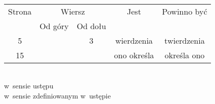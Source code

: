\documentclass[a4paper,11pt]{article}
\begin{document}
\vspace{\VerSpaceFour}





\noindent
{}  \\

\vspace{\VerSpaceFour}





\noindent
{}




\newpage



\begin{center}

  \begin{tabular}{|c|c|c|c|c|}
    \hline
    Strona & \multicolumn{2}{c|}{Wiersz} & Jest
                              & Powinno być \\ \cline{2-3}
    & Od góry & Od dołu & & \\
    \hline
    5   & &  3 & wierdzenia & twierdzenia \\
    15  & & & ono określa & określa ono \\
    \hline
  \end{tabular}

\end{center}

\vspace{\VerSpaceSix}


\noindent
{} \\
\Jest  w~sensie ustępu \\
\Powin w~sensie zdefiniowanym w~ustępie \\












{}






\end{document}

